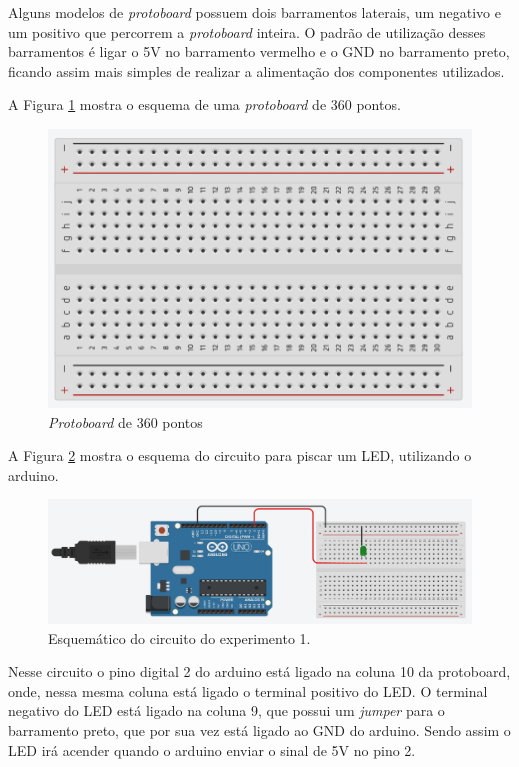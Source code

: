 \documentclass[12pt]{article}
\begin{document}
	Alguns modelos de \textit{protoboard} possuem dois barramentos laterais, um negativo e um positivo que percorrem a \textit{protoboard} inteira. O padrão de utilização desses barramentos é ligar o 5V no barramento vermelho e o GND no barramento preto, ficando assim mais simples de realizar a alimentação dos componentes utilizados.

	A Figura \ref{figProtoboard} mostra o esquema de uma \textit{protoboard} de 360 pontos.

	\begin{figure}[H]
		\centering
		\includegraphics[scale=0.5]{Imagens/figProtoboard.png}
		\caption{\textit{Protoboard} de 360 pontos}
		\label{figProtoboard}
	\end{figure}

	A Figura \ref{figExp1PiscarLEDesq} mostra o esquema do circuito para piscar um LED, utilizando o arduino.

	\begin{figure}[H]
		\centering
		\includegraphics[scale=0.3]{Imagens/Experimentos/1-PiscarLED/1-PiscarLED.png}
		\caption{Esquemático do circuito do experimento 1.}
		\label{figExp1PiscarLEDesq}
	\end{figure}

	Nesse circuito o pino digital 2 do arduino está ligado na coluna 10 da protoboard, onde, nessa mesma coluna está ligado o terminal positivo do LED. O terminal negativo do LED está ligado na coluna 9, que possui um \textit{jumper} para o barramento preto, que por sua vez está ligado ao GND do arduino. Sendo assim o LED irá acender quando o arduino enviar o sinal de 5V no pino 2.
\end{document}
